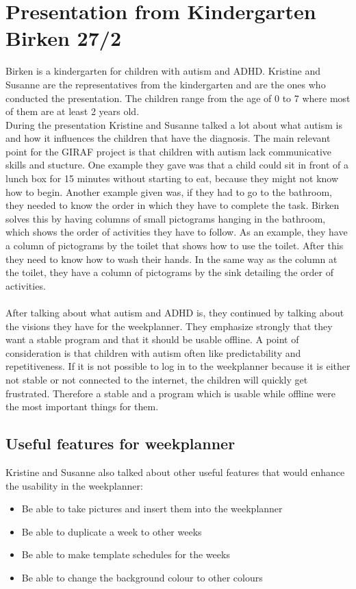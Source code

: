 \section{Presentation from Kindergarten Birken 27/2}
Birken is a kindergarten for children with autism and ADHD.
Kristine and Susanne are the representatives from the kindergarten and are the ones who conducted the presentation.
The children range from the age of 0 to 7 where most of them are at least 2 years old.
\\
During the presentation Kristine and Susanne talked a lot about what autism is and how it influences the children that have the diagnosis.
The main relevant point for the GIRAF project is that children with autism lack communicative skills and stucture. 
One example they gave was that a child could sit in front of a lunch box for 15 minutes without starting to eat, because they might not know how to begin.
Another example given was, if they had to go to the bathroom, they needed to know the order in which they have to complete the task.
Birken solves this by having columns of small pictograms hanging in the bathroom, which shows the order of activities they have to follow. 
As an example, they have a column of pictograms by the toilet that shows how to use the toilet.
After this they need to know how to wash their hands.
In the same way as the column at the toilet, they have a column of pictograms by the sink detailing the order of activities.
\\\\
After talking about what autism and ADHD is, they continued by talking about the visions they have for the weekplanner.
They emphasize strongly that they want a stable program and that it should be usable offline.
A point of consideration is that children with autism often like predictability and repetitiveness. 
If it is not possible to log in to the weekplanner because it is either not stable or not connected to the internet, the children will quickly get frustrated.
Therefore a stable and a program which is usable while offline were the most important things for them.

\subsection{Useful features for weekplanner}
Kristine and Susanne also talked about other useful features that would enhance the usability in the weekplanner:

\begin{itemize}
    \item Be able to take pictures and insert them into the weekplanner
    \item Be able to duplicate a week to other weeks
    \item Be able to make template schedules for the weeks
    \item Be able to change the background colour to other colours
\end{itemize}

